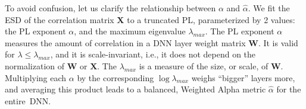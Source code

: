 To avoid confusion, let us clarify the relationship between $\alpha$ and $\hat{\alpha}$.  
We fit the ESD of the correlation matrix $\mathbf{X}$ to a truncated PL, parameterized by 2 values: the PL exponent $\alpha$, and the maximum eigenvalue $\lambda_{max}$.
The PL exponent $\alpha$ measures the amount of correlation in a DNN layer weight matrix $\mathbf{W}$. 
It is valid for $\lambda\le\lambda_{max}$, and it is scale-invariant, i.e., it does not depend on the normalization of $\mathbf{W}$ or $\mathbf{X}$.
The $\lambda_{max}$ is a measure of the size, or scale, of $\mathbf{W}$.
Multiplying each $\alpha$ by the corresponding $\log\lambda_{max}$ weighs ``bigger'' layers more, and averaging this product leads to a balanced, Weighted Alpha metric $\hat{\alpha}$ for the entire~DNN.


